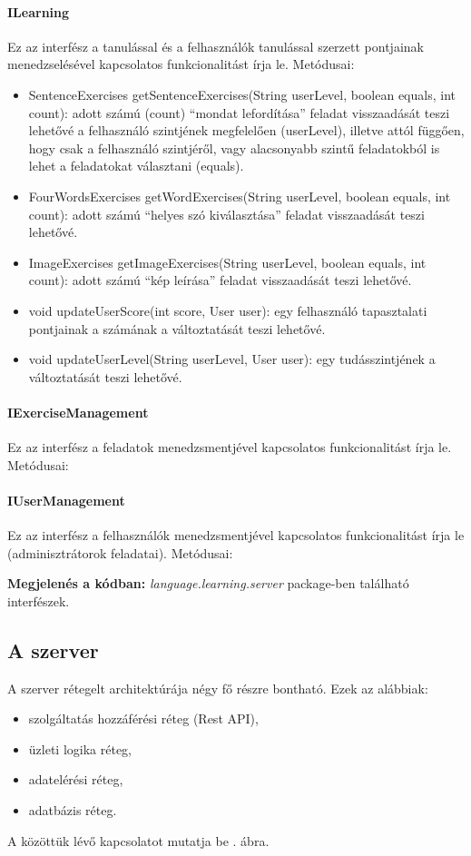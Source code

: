 \documentclass[11pt, a4paper]{article}
\begin{document}
    \paragraph{ILearning} Ez az interfész a tanulással és a felhasználók tanulással szerzett pontjainak menedzselésével kapcsolatos funkcionalitást írja le. Metódusai:
    \begin{itemize}
    	\item SentenceExercises getSentenceExercises(String userLevel, boolean equals, int count): adott számú (count) ``mondat lefordítása'' feladat visszaadását teszi lehetővé a felhasználó szintjének megfelelően (userLevel), illetve attól függően, hogy csak a felhasználó szintjéről, vagy alacsonyabb szintű feladatokból is lehet a feladatokat választani (equals).
    	
    	\item FourWordsExercises getWordExercises(String userLevel, boolean equals, int count): adott számú ``helyes szó kiválasztása'' feladat visszaadását teszi lehetővé.
    	
    	\item ImageExercises getImageExercises(String userLevel, boolean equals, int count): adott számú ``kép leírása'' feladat visszaadását teszi lehetővé.
    	
    	\item void updateUserScore(int score, User user): egy felhasználó tapasztalati pontjainak a számának a változtatását teszi lehetővé.
    	
    	\item void updateUserLevel(String userLevel, User user): egy tudásszintjének a változtatását teszi lehetővé.
    \end{itemize}
    \paragraph{IExerciseManagement} Ez az interfész a feladatok menedzsmentjével kapcsolatos funkcionalitást írja le. Metódusai:
    \paragraph{IUserManagement} Ez az interfész a felhasználók menedzsmentjével kapcsolatos funkcionalitást írja le (adminisztrátorok feladatai). Metódusai:
    
    \textbf{Megjelenés a kódban:} \textit{language.learning.server} package-ben található interfészek.
    
    \subsection{A szerver}
    A szerver rétegelt architektúrája négy fő részre bontható. Ezek az alábbiak:
    \begin{itemize}
    	\item szolgáltatás hozzáférési réteg (Rest API),
    	\item üzleti logika réteg,
    	\item adatelérési réteg,
    	\item adatbázis réteg.
    \end{itemize}
    A közöttük lévő kapcsolatot mutatja be . ábra.
    
\end{document}
